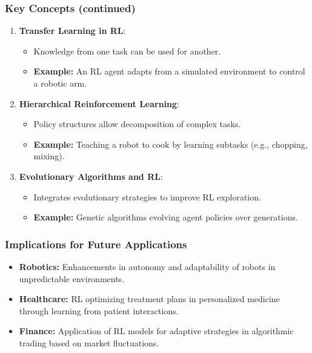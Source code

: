 \documentclass[aspectratio=169]{beamer}
\begin{document}
\begin{frame}
    \frametitle{Key Concepts (continued)}
    \begin{enumerate}[resume]
        \item \textbf{Transfer Learning in RL}:
            \begin{itemize}
                \item Knowledge from one task can be used for another.
                \item \textbf{Example:} An RL agent adapts from a simulated environment to control a robotic arm.
            \end{itemize}
        \item \textbf{Hierarchical Reinforcement Learning}:
            \begin{itemize}
                \item Policy structures allow decomposition of complex tasks.
                \item \textbf{Example:} Teaching a robot to cook by learning subtasks (e.g., chopping, mixing).
            \end{itemize}
        \item \textbf{Evolutionary Algorithms and RL}:
            \begin{itemize}
                \item Integrates evolutionary strategies to improve RL exploration.
                \item \textbf{Example:} Genetic algorithms evolving agent policies over generations.
            \end{itemize}
    \end{enumerate}
\end{frame}

\begin{frame}
    \frametitle{Implications for Future Applications}
    \begin{itemize}
        \item \textbf{Robotics:} Enhancements in autonomy and adaptability of robots in unpredictable environments.
        \item \textbf{Healthcare:} RL optimizing treatment plans in personalized medicine through learning from patient interactions.
        \item \textbf{Finance:} Application of RL models for adaptive strategies in algorithmic trading based on market fluctuations.
    \end{itemize}
\end{frame}
\end{document}
